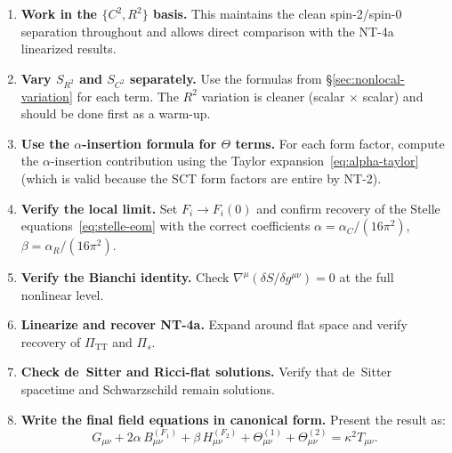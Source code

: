 \documentclass[12pt,a4paper]{article}
\theoremstyle{definition}
\theoremstyle{remark}
\begin{document}
\begin{enumerate}[label=\textbf{Step \arabic*.}]
\item \textbf{Work in the $\{C^2, R^2\}$ basis.}
  This maintains the clean spin-2/spin-0 separation throughout and
  allows direct comparison with the NT-4a linearized results.

\item \textbf{Vary $S_{R^2}$ and $S_{C^2}$ separately.}
  Use the formulas from \S\ref{sec:nonlocal-variation} for each term.
  The $R^2$ variation is cleaner (scalar $\times$ scalar) and should
  be done first as a warm-up.

\item \textbf{Use the $\alpha$-insertion formula for $\Theta$ terms.}
  For each form factor, compute the $\alpha$-insertion contribution
  using the Taylor expansion~\eqref{eq:alpha-taylor} (which is valid
  because the SCT form factors are entire by NT-2).

\item \textbf{Verify the local limit.}
  Set $F_i \to F_i(0)$ and confirm recovery of the Stelle
  equations~\eqref{eq:stelle-eom} with the correct coefficients
  $\alpha = \alpha_C/(16\pi^2)$, $\beta = \alpha_R/(16\pi^2)$.

\item \textbf{Verify the Bianchi identity.}
  Check $\nabla^\mu(\delta S/\delta g^{\mu\nu}) = 0$ at the
  full nonlinear level.

\item \textbf{Linearize and recover NT-4a.}
  Expand around flat space and verify recovery of
  $\Pi_{\mathrm{TT}}$ and $\Pi_s$.

\item \textbf{Check de~Sitter and Ricci-flat solutions.}
  Verify that de~Sitter spacetime and Schwarzschild remain solutions.

\item \textbf{Write the final field equations in canonical form.}
  Present the result as:
  \begin{equation}
    G_{\mu\nu} + 2\alpha\,B_{\mu\nu}^{(F_1)}
    + \beta\,H_{\mu\nu}^{(F_2)}
    + \Theta_{\mu\nu}^{(1)} + \Theta_{\mu\nu}^{(2)}
    = \kappa^2 T_{\mu\nu}.
  \end{equation}
\end{enumerate}
\end{document}
